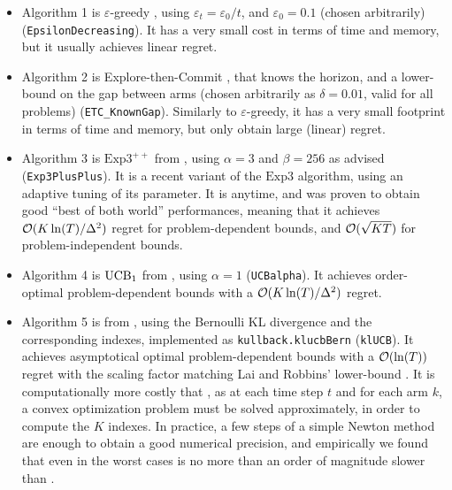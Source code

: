 \begin{itemize}
    \item Algorithm 1 is
    $\varepsilon$-greedy \cite{Bubeck12}, using $\varepsilon_t = \varepsilon_0 / t$, and $\varepsilon_0 = 0.1$ (chosen arbitrarily) (\texttt{EpsilonDecreasing}).
    It has a very small cost in terms of time and memory, but it usually achieves linear regret.

    \item Algorithm 2 is
    Explore-then-Commit \cite{GarivierETC2016}, that knows the horizon, and a lower-bound on the gap between arms (chosen arbitrarily as $\delta=0.01$, valid for all problems) (\texttt{ETC\_KnownGap}).
    Similarly to $\varepsilon$-greedy, it has a very small footprint in terms of time and memory, but only obtain large (linear) regret.

    \item Algorithm 3 is
    $\mathrm{Exp}3^{++}$ from \cite{Seldin17}, using $\alpha=3$ and $\beta=256$ as advised (\texttt{Exp3PlusPlus}).
    It is a recent variant of the $\mathrm{Exp3}$ algorithm, using an adaptive tuning of its parameter. It is anytime, and was proven to obtain good ``best of both world'' performances, meaning that it achieves $\mathcal{O}(K\ln(T)/\Delta^2)$ regret for problem-dependent bounds, and $\mathcal{O}(\sqrt{KT})$ for problem-independent bounds.

    \item Algorithm 4 is
    $\mathrm{UCB}_1$ from \cite{Auer02}, using $\alpha=1$ (\texttt{UCBalpha}).
    It achieves order-optimal problem-dependent bounds with a $\mathcal{O}(K\ln(T)/\Delta^2)$ regret.

    \item Algorithm 5 is
    \klUCB{} from \cite{KLUCBJournal}, using the Bernoulli KL divergence and the corresponding \klUCB{} indexes, implemented as \texttt{kullback.klucbBern} (\texttt{klUCB}).
    It achieves asymptotical optimal problem-dependent bounds with a $\mathcal{O}(\ln(T))$ regret with the scaling factor matching Lai and Robbins' lower-bound \cite{LaiRobbins85}.
    It is computationally more costly that \UCB, as at each time step $t$ and for each arm $k$, a convex optimization problem must be solved approximately, in order to compute the $K$ indexes.
    In practice, a few steps of a simple Newton method are enough to obtain a good numerical precision, and empirically we found that even in the worst cases \klUCB{} is no more than an order of magnitude slower than \UCB.


\end{itemize}
